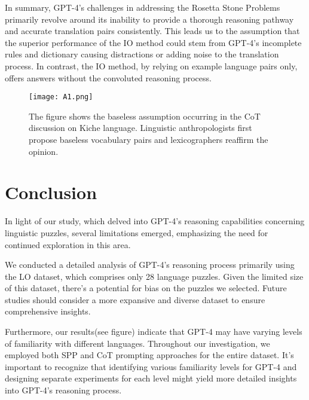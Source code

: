\documentclass[10pt, a4paper]{article}
\begin{document}
In summary, GPT-4's challenges in addressing the Rosetta Stone Problems primarily revolve around its inability to provide a thorough reasoning pathway and accurate translation pairs consistently. This leads us to the assumption that the superior performance of the IO method could stem from GPT-4's incomplete rules and dictionary causing distractions or adding noise to the translation process. In contrast, the IO method, by relying on example language pairs only, offers answers without the convoluted reasoning process.

\begin{figure}[htp]
    \centering
    \texttt{[image: A1.png]}
    \caption{The figure shows the baseless assumption occurring in the CoT discussion on Kiche language. Linguistic anthropologists first propose baseless vocabulary pairs and lexicographers reaffirm the opinion.}
    \label{A1}
\end{figure}

 


\section{Conclusion}

In light of our study, which delved into GPT-4’s reasoning capabilities concerning linguistic puzzles, several limitations emerged, emphasizing the need for continued exploration in this area.

We conducted a detailed analysis of GPT-4’s reasoning process primarily using the LO dataset, which comprises only 28 language puzzles. Given the limited size of this dataset, there’s a potential for bias on the puzzles we selected. Future studies should consider a more expansive and diverse dataset to ensure comprehensive insights.

Furthermore, our results(see figure) indicate that GPT-4 may have varying levels of familiarity with different languages. Throughout our investigation, we employed both SPP and CoT prompting approaches for the entire dataset. It’s important to recognize that identifying various familiarity levels for GPT-4 and designing separate experiments for each level might yield more detailed insights into GPT-4’s reasoning process.
\end{document}
